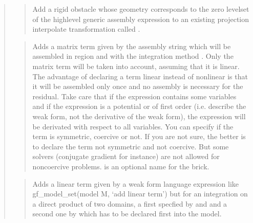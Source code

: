 \documentclass[a4paper,11pt,english]{sphinxmanual}
\begin{document}
\begin{quote}
\begin{quote}

Add a rigid obstacle whose geometry corresponds to the zero level\sphinxhyphen{}set
of the high\sphinxhyphen{}level generic assembly expression 
to an existing projection interpolate transformation called .
\end{quote}

\begin{quote}

Adds a matrix term given by the assembly string  which will
be assembled in region  and with the integration method .
Only the matrix term will be taken into account, assuming that it is
linear.
The advantage of declaring a term linear instead of nonlinear is that
it will be assembled only once and no assembly is necessary for the
residual.
Take care that if the expression contains some variables and if the
expression is a potential or of first order (i.e. describe the weak
form, not the derivative of the weak form), the expression will be
derivated with respect to all variables.
You can specify if the term is symmetric, coercive or not.
If you are not sure, the better is to declare the term not symmetric
and not coercive. But some solvers (conjugate gradient for instance)
are not allowed for non\sphinxhyphen{}coercive problems.
 is an optional name for the brick.
\end{quote}

\begin{quote}

Adds a linear term given by a weak form language expression like
gf\_model\_set(model M, ‘add linear term’) but for an integration on a direct
product of two domains, a first specfied by  and 
and a second one by  which has to be declared
first into the model.
\end{quote}


\end{quote}
\end{document}
